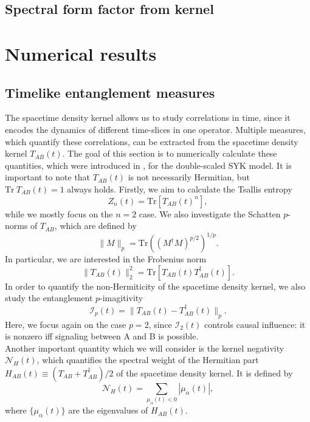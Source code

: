 \documentclass[11pt,a4paper]{article}
\begin{document}
\subsection{Spectral form factor from kernel}

\section{Numerical results}

\subsection{Timelike entanglement measures}
The spacetime density kernel allows us to study correlations in time, since it encodes the dynamics of different time-slices in one operator. Multiple measures, which quantify these correlations, can be extracted from the spacetime density kernel $T_{AB}(t)$. The goal of this section is to numerically calculate these quantities, which were introduced in \cite{Das:2026ifj}, for the double-scaled SYK model. It is important to note that $T_{AB}(t)$ is not necessarily Hermitian, but $\text{Tr}\ T_{AB}(t)=1$ always holds. Firstly, we aim to calculate the Tsallis entropy
\begin{equation}
    Z_n(t)=\text{Tr} [T_{AB}(t)^n],
\end{equation}
while we mostly focus on the $n=2$ case. We also investigate the Schatten $p$-norms of $T_{AB}$, which are defined by 
\begin{equation}
    \|M\|_p=\text{Tr}\left((M^\dagger M)^{p/2}\right)^{1/p}.
\end{equation}
In particular, we are interested in the Frobenius norm 
\begin{equation}
    \|T_{AB}(t)\|_2^2=\text{Tr}\left[T_{AB}(t)T^\dagger_{AB}(t)\right].
\end{equation}
In order to quantify the non-Hermiticity of the spacetime density kernel, we also study the entanglement $p$-imagitivity 
\begin{equation}
    \mathcal{I}_p(t)=\|T_{AB}(t)-T^\dagger_{AB}(t)\|_p.
\end{equation}
Here, we focus again on the case $p=2$, since $\mathcal{I}_2(t)$ controls causal influence: it is nonzero iff signaling between A and B is possible.\\
Another important quantity which we will consider is the kernel negativity $\mathcal{N}_H(t)$, which quantifies the spectral weight of the Hermitian part $H_{AB}(t)\equiv(T_{AB}+T^\dagger_{AB})/2$ of the spacetime density kernel. It is defined by
\begin{equation}
    \mathcal{N}_H(t)=\sum_{\mu_\alpha(t)<0}|\mu_\alpha(t)|,
\end{equation}
where $\{\mu_\alpha(t)\}$ are the eigenvalues of $H_{AB}(t)$.
\end{document}
